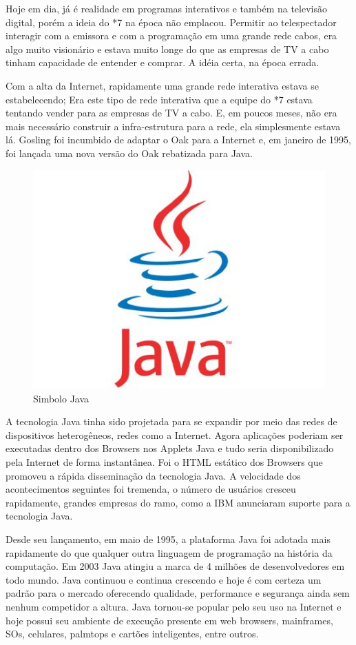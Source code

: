 \documentclass[
	12pt,				%
	openright,			%
	oneside,			%
	a4paper,			%
	english,			%
	french,				%
	spanish,			%
	brazil				%
	]{abntex2}
\begin{document}
Hoje em dia, já é realidade em programas interativos e também na televisão digital, porém a ideia do *7 na época não emplacou.  Permitir ao telespectador interagir com a emissora e com a programação em uma grande rede cabos, era algo muito visionário e estava muito longe do que as empresas de TV a cabo tinham capacidade de entender e comprar. A idéia certa, na época errada.

Com a alta da Internet, rapidamente uma grande rede interativa estava se estabelecendo; Era este tipo de rede interativa que a equipe do *7 estava tentando vender para as empresas de TV a cabo. E, em poucos meses, não era mais necessário construir a infra-estrutura para a rede, ela simplesmente estava lá. Gosling foi incumbido de adaptar o Oak para a Internet e, em janeiro de 1995, foi lançada uma nova versão do Oak rebatizada para Java. 

\begin{figure}[!h]
\centering
  \includegraphics[width=0.75\linewidth]{java.jpg}
  \caption{Simbolo Java}
  \label{fig:Mascote Java}
\end{figure}

A tecnologia Java tinha sido projetada para se expandir por meio das redes de dispositivos heterogêneos, redes como a Internet. Agora aplicações poderiam ser
executadas dentro dos Browsers nos Applets Java e tudo seria disponibilizado pela Internet de forma instantânea. Foi o HTML estático dos Browsers que promoveu a rápida disseminação da tecnologia Java. A velocidade dos acontecimentos seguintes foi tremenda, o número de usuários cresceu rapidamente, grandes empresas do ramo, como a IBM anunciaram suporte para a tecnologia Java.

Desde seu lançamento, em maio de 1995, a plataforma Java foi adotada mais rapidamente do que qualquer outra linguagem de programação na história da computação. Em 2003 Java atingiu a marca de 4 milhões de desenvolvedores em todo mundo. Java continuou e continua crescendo e hoje é com certeza um padrão para o mercado oferecendo qualidade, performance e segurança ainda sem nenhum competidor a altura. Java tornou-se popular pelo seu uso na Internet e hoje possui seu ambiente de execução presente em web browsers, mainframes, SOs, celulares, palmtops
e cartões inteligentes, entre outros.
\end{document}
